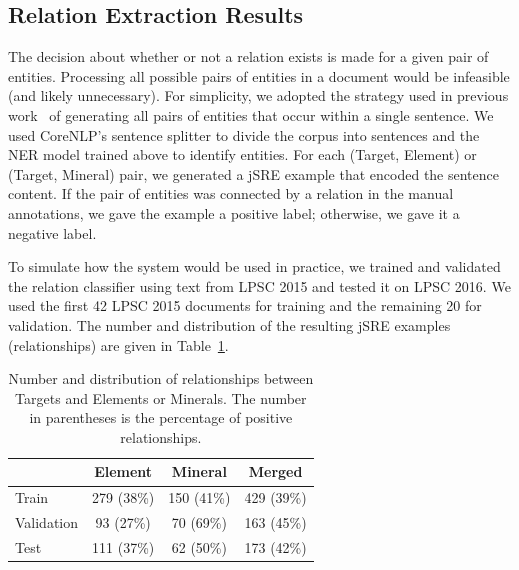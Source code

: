 \documentclass[letterpaper]{article} %
\begin{document}


\subsection{Relation Extraction Results}

The decision about whether or not a relation exists is made for a
given pair of entities.  Processing all possible pairs of entities in
a document would be infeasible (and likely unnecessary).  For
simplicity, we adopted the strategy used in previous
work~\cite{giuliano:jsre06} of generating all pairs of entities that
occur within a single sentence.  We used CoreNLP's sentence splitter
to divide the corpus into sentences and the NER model trained above to
identify entities.  For each (Target, Element) or (Target, Mineral)
pair, we generated a jSRE example that encoded the sentence content.
If the pair of entities was connected by a relation in the manual
annotations, we gave the example a positive label; otherwise, we gave
it a negative label.

To simulate how the system would be used in practice, we trained and
validated the relation classifier using text from LPSC 2015 and tested
it on LPSC 2016.  We used the first 42 LPSC 2015 documents for
training and the remaining 20 for validation.  The number and
distribution of the resulting jSRE examples (relationships) are given
in Table~\ref{tab:rels}.  

\begin{table}
\caption{Number and distribution of relationships between Targets and
Elements or Minerals. The number in parentheses is the percentage of
positive relationships. }
\label{tab:rels}
\begin{center}
\begin{tabular}{l|ccc}
           & Element & Mineral & Merged \\ \hline 
Train      & 279 (38\%) & 150 (41\%) & 429 (39\%) \\
Validation &  93 (27\%) &  70 (69\%) & 163 (45\%) \\ \hline
Test       & 111 (37\%) &  62 (50\%) & 173 (42\%) \\ \hline
\end{tabular}
\end{center}
\end{table}
\end{document}
